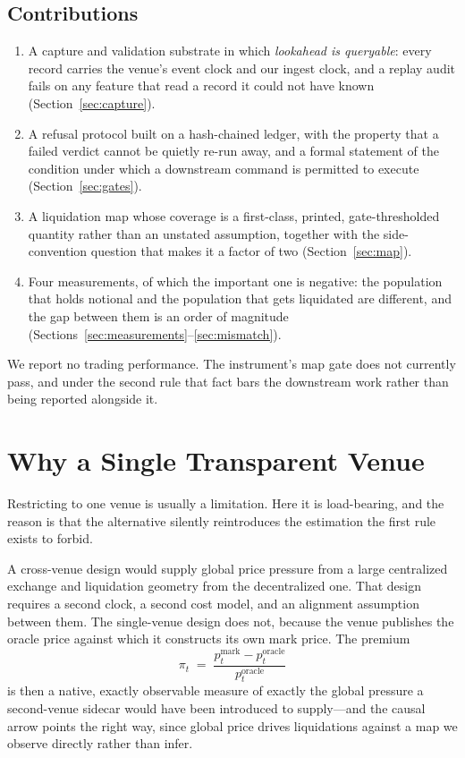 \documentclass[11pt,a4paper]{article}
\theoremstyle{definition}
\theoremstyle{plain}
\begin{document}
\subsection{Contributions}

\begin{enumerate}
  \item A capture and validation substrate in which \emph{lookahead is queryable}: every record
        carries the venue's event clock and our ingest clock, and a replay audit fails on any feature
        that read a record it could not have known (Section~\ref{sec:capture}).
  \item A refusal protocol built on a hash-chained ledger, with the property that a failed verdict
        cannot be quietly re-run away, and a formal statement of the condition under which a
        downstream command is permitted to execute (Section~\ref{sec:gates}).
  \item A liquidation map whose coverage is a first-class, printed, gate-thresholded quantity rather
        than an unstated assumption, together with the side-convention question that makes it a
        factor of two (Section~\ref{sec:map}).
  \item Four measurements, of which the important one is negative: the population that holds notional
        and the population that gets liquidated are different, and the gap between them is an order
        of magnitude (Sections~\ref{sec:measurements}--\ref{sec:mismatch}).
\end{enumerate}

We report no trading performance. The instrument's map gate does not currently pass, and under the
second rule that fact bars the downstream work rather than being reported alongside it.

\section{Why a Single Transparent Venue}
\label{sec:venue}

Restricting to one venue is usually a limitation. Here it is load-bearing, and the reason is that
the alternative silently reintroduces the estimation the first rule exists to forbid.

A cross-venue design would supply global price pressure from a large centralized exchange and
liquidation geometry from the decentralized one. That design requires a second clock, a second cost
model, and an alignment assumption between them. The single-venue design does not, because the venue
publishes the oracle price against which it constructs its own mark price. The premium
\begin{equation}
  \pi_t \;=\; \frac{p^{\text{mark}}_t - p^{\text{oracle}}_t}{p^{\text{oracle}}_t}
  \label{eq:premium}
\end{equation}
is then a native, exactly observable measure of exactly the global pressure a second-venue sidecar
would have been introduced to supply---and the causal arrow points the right way, since global price
drives liquidations against a map we observe directly rather than infer.
\end{document}
